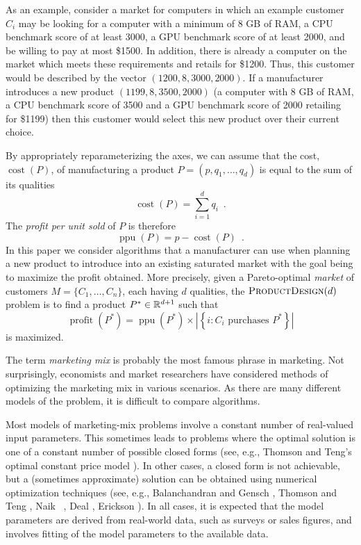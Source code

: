 \documentclass[lotsofwhite]{patmorin}
\newcommand{\cost}{\operatorname{cost}}
\newcommand{\ppu}{\operatorname{ppu}}
\newcommand{\val}{\operatorname{profit}}
\begin{document}
As an example, consider a market for computers in which an example customer
$C_i$ may be looking for a computer with a minimum of 8 GB of RAM, a CPU
benchmark score of at least 3000, a GPU benchmark score of at least 2000,
and be willing to pay at most \$1500.  In addition, there is already a
computer on the market which meets these requirements and retails for
\$1200.  Thus, this customer would be described by the vector
$(1200,8,3000,2000)$.  If a manufacturer introduces a new product
$(1199,8,3500,2000)$ (a computer with 8 GB of RAM, a CPU benchmark score of
3500 and a GPU benchmark score of 2000 retailing for \$1199) then this
customer would select this new product over their current choice.

By appropriately reparameterizing the axes, we can assume that the cost,
$\cost(P)$, of manufacturing a product $P=(p,q_1,\ldots,q_d)$ is equal to
the sum of its qualities
\[
   \cost(P) = \sum_{i=1}^d q_i \enspace .
\]
The \emph{profit per unit sold} of $P$ is therefore
\[
   \ppu(P) = p-\cost(P) \enspace .
\]
In this paper we consider algorithms that a manufacturer can use when
planning a new product to introduce into an existing saturated market
with the goal being to maximize the profit obtained.  More precisely,
given a Pareto-optimal \emph{market} of customers $M=\{C_1,\ldots,C_n\}$,
each having $d$ qualities, the $\textsc{ProductDesign}(d)$ problem is to
find a product $P^*\in\mathbb{R}^{d+1}$ such that
\[
  \val(P^*) = \ppu(P^*)
    \times 
      \left| \left\{ i:\mbox{$C_i$ purchases $P^*$} \right\} \right|
\]
is maximized.  

The term \emph{marketing mix} is probably the most famous phrase in
marketing. Not surprisingly, economists and market researchers have
considered methods of optimizing the marketing mix in various scenarios.
As there are many different models of the problem, it is difficult to
compare algorithms.  

Most models of marketing-mix problems involve a constant number of
real-valued input parameters.  This sometimes leads to problems where
the optimal solution is one of a constant number of possible closed forms
(see, e.g., Thomson and Teng's optimal constant price model \cite{tt84}).
In other cases, a closed form is not achievable, but a (sometimes
approximate) solution can be obtained using numerical optimization
techniques (see, e.g., Balanchandran and Gensch \cite{bg74}, Thomson and
Teng \cite{tt84}, Naik \etal\ \cite{nrw04}, Deal \cite{d79}, Erickson
\cite{e91}).  In all cases, it is expected that the model parameters
are derived from real-world data, such as surveys or sales figures,
and involves fitting of the model parameters to the available data.
\end{document}
